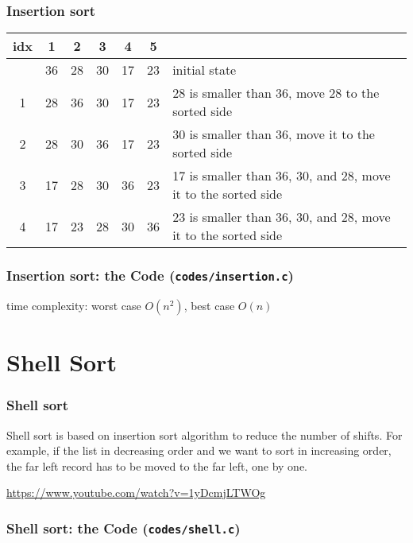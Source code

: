 \documentclass[newPxFont,sthlmFooter,nooffset]{beamer}
\begin{document}
\begin{frame}[t, fragile]
  \frametitle{Insertion sort}
\begin{tabular}{c | c | c | c | c | c | p{6.5cm}}
  idx   & 1  & 2  & 3  & 4  & 5  & ~ \\ \hline
          & 36 & 28 & 30 & 17 & 23 & initial state\\ \hline
  1       & \color{red}28 & \color{red}36 & 30 & 17 & 23 & {\footnotesize 28 is smaller than 36, move 28 to the sorted side } \pause \\  \hline
  2       & \color{red}28 & \color{red}30 & \color{red}36 & 17 & 23 & {\footnotesize 30 is smaller than 36, move it to the sorted side} \pause \\  \hline
  3       & \color{red}17 & \color{red}28 & \color{red}30 & \color{red}36 & 23 & {\footnotesize 17 is smaller than 36, 30, and 28, move it to the sorted side} \pause \\  \hline
  4       & \color{red}17 & \color{red}23 & \color{red}28 & \color{red}30 & \color{red}36 & {\footnotesize 23 is smaller than 36, 30, and 28, move it to the sorted side} 
\end{tabular}
\end{frame}


\begin{frame}[t, fragile]
  \frametitle{Insertion sort: the Code (\texttt{codes/insertion.c})}
  

time complexity: worst case $O(n^2)$, best case $O(n)$
\end{frame}


\section{Shell Sort}
\begin{frame}[t]
  \frametitle{Shell sort}
Shell sort is based on insertion sort algorithm to reduce the number of shifts. For example, if the list in decreasing order and we want to sort in increasing order, the far left record has to be moved to the far left, one by one.

\url{https://www.youtube.com/watch?v=1yDcmjLTWOg}
\end{frame}

\begin{frame}[t, fragile]
  \frametitle{Shell sort: the Code (\texttt{codes/shell.c})}
  


\end{frame}
\end{document}
